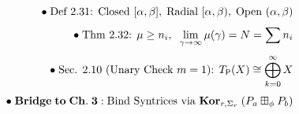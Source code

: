 \documentclass[preview]{standalone}
\begin{document}
\begin{align*}
\special{dvisvgm:raw <g id='unique000'>}\bullet\;\text{Def 2.31: Closed }[\alpha,\beta],\;\text{Radial }[\alpha,\beta),\;\text{Open }(\alpha,\beta)\\[3pt]\bullet\;\text{Thm 2.32: }\mu\ge n_i,\;\;\lim_{\gamma\to\infty}\mu(\gamma) = N = \sum n_i\\[3pt]\bullet\;\text{Sec. 2.10 (Unary Check }m=1\text{): }T_{\mathsf{P}}(X)\cong\bigoplus_{k=0}^\infty X\\[3pt]\bullet\;\mathbf{Bridge\;to\;Ch.\;3:}\;\text{Bind Syntrices via }\mathbf{Kor}_{r,\Sigma_r}\;(P_a\boxplus_\phi P_b)\special{dvisvgm:raw </g>}
\end{align*}
\end{document}
